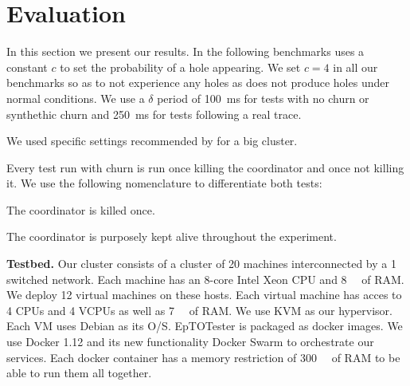 
\section{Evaluation}
\label{sec:evaluation}
\tableaverage
{}\tableaveragereal
{}\tableglobaltime
{}\tablelocaldeltas
{}\tablelocaltime
In this section we present our results. In the following benchmarks \epto uses a constant $c$ to set the probability of a hole appearing. We set $c = 4$ in all our benchmarks so as to not experience any holes as \jgroups does not produce holes under normal conditions. We use a $\delta$ period of \SI{100}{\milli\second} for tests with no churn or synthethic churn and \SI{250}{\milli\second} for tests following a real trace.
\par 
We used specific settings recommended by \jgroups for a big cluster.
\par
Every \jgroups test run with churn is run once killing the coordinator and once not killing it. We use the following nomenclature to differentiate both tests:
\begin{description}
	\item[\textbf{\jgroups-coord}:] The coordinator is killed once.
	\item[\textbf{\jgroups-nocoord}:] The coordinator is purposely kept alive throughout the experiment.
\end{description}
\par
\textbf{Testbed.} Our cluster consists of a cluster of 20 machines interconnected by a \SI{1}{\gbps} switched network. Each machine has an 8-core Intel Xeon CPU and \SI{8}{\giga\byte} of RAM. We deploy 12 virtual machines on these hosts. Each virtual machine has acces to 4 CPUs and 4 VCPUs as well as \SI{7}{\giga\byte} of RAM. We use KVM as our hypervisor. Each VM uses Debian as its O/S. EpTOTester is packaged as docker images. We use Docker 1.12 and its new functionality Docker Swarm to orchestrate our services. Each docker container has a memory restriction of \SI{300}{\mega\byte} of RAM to be able to run them all together.
\par
